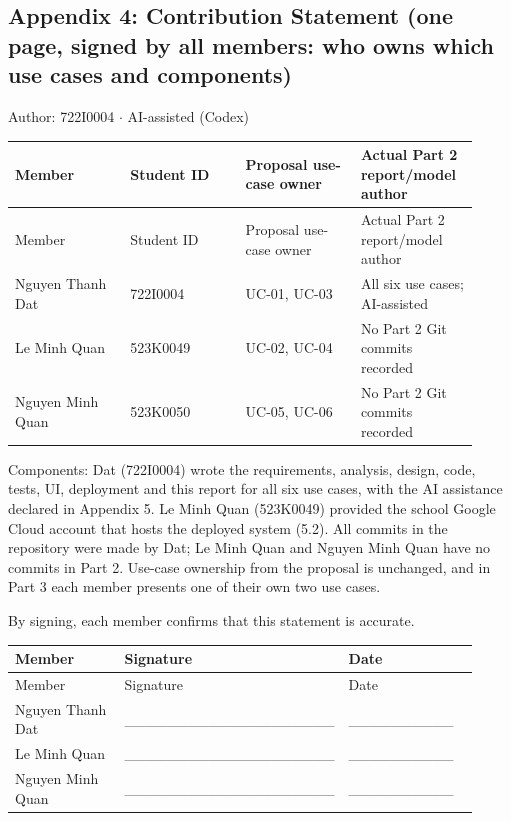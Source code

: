 \subsection*{Appendix 4: Contribution Statement (one page, signed by all members: who owns which use cases and components)}
Author: 722I0004 \ensuremath{\cdot} AI-assisted (Codex)

\begin{longtable}{>{\raggedright\arraybackslash}p{0.2300\linewidth}>{\raggedright\arraybackslash}p{0.2300\linewidth}>{\raggedright\arraybackslash}p{0.2300\linewidth}>{\raggedright\arraybackslash}p{0.2300\linewidth}}
Member & Student ID & Proposal use-case owner & Actual Part 2 report/model author \\
\hline\endfirsthead
Member & Student ID & Proposal use-case owner & Actual Part 2 report/model author \\
\hline\endhead
Nguyen Thanh Dat & 722I0004 & UC-01, UC-03 & All six use cases; AI-assisted \\
Le Minh Quan & 523K0049 & UC-02, UC-04 & No Part 2 Git commits recorded \\
Nguyen Minh Quan & 523K0050 & UC-05, UC-06 & No Part 2 Git commits recorded \\
\end{longtable}
Components: Dat (722I0004) wrote the requirements, analysis, design, code, tests, UI, deployment and this report for all six use cases, with the AI assistance declared in Appendix 5. Le Minh Quan (523K0049) provided the school Google Cloud account that hosts the deployed system (5.2). All commits in the repository were made by Dat; Le Minh Quan and Nguyen Minh Quan have no commits in Part 2. Use-case ownership from the proposal is unchanged, and in Part 3 each member presents one of their own two use cases.

By signing, each member confirms that this statement is accurate.

\begin{longtable}{>{\raggedright\arraybackslash}p{0.3067\linewidth}>{\raggedright\arraybackslash}p{0.3067\linewidth}>{\raggedright\arraybackslash}p{0.3067\linewidth}}
Member & Signature & Date \\
\hline\endfirsthead
Member & Signature & Date \\
\hline\endhead
Nguyen Thanh Dat & \_\_\_\_\_\_\_\_\_\_\_\_\_\_\_\_\_\_\_\_ & \_\_\_\_\_\_\_\_\_\_ \\
Le Minh Quan & \_\_\_\_\_\_\_\_\_\_\_\_\_\_\_\_\_\_\_\_ & \_\_\_\_\_\_\_\_\_\_ \\
Nguyen Minh Quan & \_\_\_\_\_\_\_\_\_\_\_\_\_\_\_\_\_\_\_\_ & \_\_\_\_\_\_\_\_\_\_ \\
\end{longtable}

